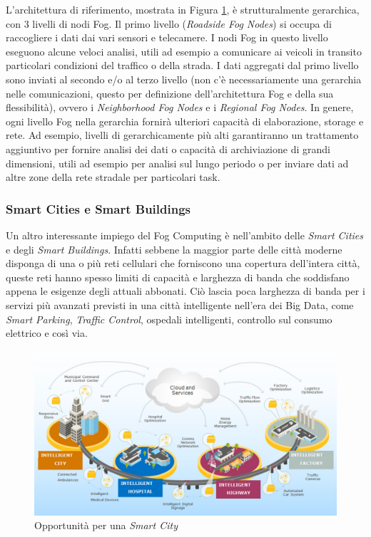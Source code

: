 L'architettura di riferimento, mostrata in Figura \ref{fig:smartcars_trafficcontrol}, è strutturalmente gerarchica, con 3 livelli di nodi Fog. Il primo livello (\textit{Roadside Fog Nodes}) si occupa di raccogliere i dati dai vari sensori e telecamere. I nodi Fog in questo livello eseguono alcune veloci analisi, utili ad esempio a comunicare ai veicoli in transito particolari condizioni del traffico o della strada. I dati aggregati dal primo livello sono inviati al secondo e/o al terzo livello (non c'è necessariamente una gerarchia nelle comunicazioni, questo per definizione dell'architettura Fog e della sua flessibilità), ovvero i \textit{Neighborhood Fog Nodes} e i \textit{Regional Fog Nodes}. In genere, ogni livello Fog nella gerarchia fornirà ulteriori capacità di elaborazione, storage e rete. Ad esempio, livelli di gerarchicamente più alti garantiranno un trattamento aggiuntivo per fornire analisi dei dati o capacità di archiviazione di grandi dimensioni, utili ad esempio per analisi sul lungo periodo o per inviare dati ad altre zone della rete stradale per particolari task.

\subsubsection{Smart Cities e Smart Buildings}

Un altro interessante impiego del Fog Computing è nell'ambito delle \textit{Smart Cities} e degli \textit{Smart Buildings}. Infatti sebbene  la maggior parte delle città moderne disponga di una o più reti cellulari che forniscono una copertura dell'intera città, queste reti hanno spesso limiti di capacità e larghezza di banda che soddisfano appena le esigenze degli attuali abbonati. Ciò lascia poca larghezza di banda per i servizi più avanzati previsti in una città intelligente nell'era dei Big Data, come \textit{Smart Parking}, \textit{Traffic Control}, ospedali intelligenti, controllo sul consumo elettrico e così via.  

\begin{figure}[!ht]
  \includegraphics[width=14cm]{images/smartcities_smartbuildings}
  \centering
  \caption[Opportunità per una Smart City]{Opportunità per una \textit{Smart City} \cite{OpenFogReferenceArchitecture}}
  \label{fig:smartcars_trafficcontrol}
\end{figure}


